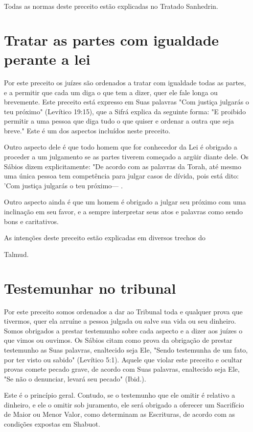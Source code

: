 Todas as normas deste preceito estão explicadas no Tratado Sanhedrin.


\section{Tratar as partes com igualdade perante a lei}

Por este preceito os juízes são ordenados a tratar com igualdade to­das
as partes, e a permitir que cada um diga o que tem a dizer, quer ele
fale longa ou brevemente. Este preceito está expresso em Suas palavras
"Com justi­ça julgarás o teu próximo" (Levítico 19:15), que a Sifrá
explica da seguinte for­ma: "E proibido permitir a uma pessoa que diga
tudo o que quiser e ordenar a outra que seja breve." Este é um dos
aspectos incluídos neste preceito.

Outro aspecto dele é que todo homem que for conhecedor da Lei é obrigado
a proceder a um julgamento se as partes tiverem começado a argüir diante
dele. Os Sábios dizem explicitamente: "De acordo com as palavras da
Torah, até mesmo uma única pessoa tem competência para julgar casos de
dívi­da, pois está dito: 'Com justiça julgarás o teu
próximo--- .

Outro aspecto ainda é que um homem é obrigado a julgar seu próxi­mo com
uma inclinação em seu favor, e a sempre interpretar seus atos e
pala­vras como sendo bons e caritativos.


As intenções deste preceito estão explicadas em diversos trechos do


Talmud.



\section{Testemunhar no tribunal}

Por este preceito somos ordenados a dar ao Tribunal toda e qual­quer
prova que tivermos, quer ela arruíne a pessoa julgada ou salve sua vida
ou seu dinheiro. Somos obrigados a prestar testemunho sobre cada aspecto
e a dizer aos juízes o que vimos ou ouvimos. Os Sábios citam como prova
da obrigação de prestar testemunho as Suas palavras, enaltecido seja
Ele, "Sendo testemunha de um fato, por ter visto ou sabido" (Levítico
5:1). Aquele que vio­lar este preceito e ocultar provas comete pecado
grave, de acordo com Suas palavras, enaltecido seja Ele, "Se não o
denunciar, levará seu pecado" (Ibid.).

Este é o princípio geral. Contudo, se o testemunho que ele omitir é
relativo a dinheiro, e ele o omitir sob juramento, ele será obrigado a
oferecer um Sacrifício de Maior ou Menor Valor, como determinam as
Escrituras, de acor­do com as condições expostas em Shabuot.


